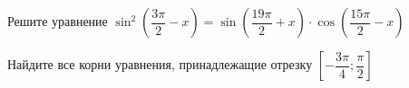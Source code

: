 \begin{ex}
	\begin{condition}
		\begin{enumcols}[label=\asbuk*)]
			\item Решите уравнение \( \sin^2 {\left(\dfrac{3\pi}{2}- x\right)} = \sin{\left(\dfrac{19\pi}{2}+x\right)}\cdot \cos{\left(\dfrac{15\pi}{2}-x\right)} \)
			\item Найдите все корни уравнения, принадлежащие отрезку \( \left[-\dfrac{3\pi}{4};\dfrac{\pi}{2}\right] \)
		\end{enumcols}
	\end{condition}
\end{ex}